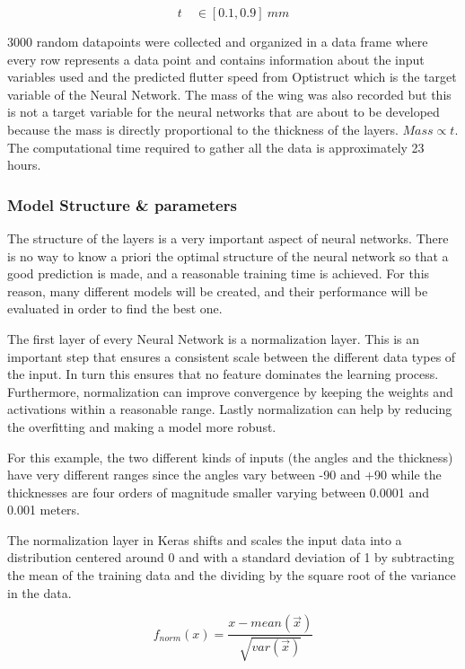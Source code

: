 \begin{equation}
t \quad \in [ 0.1, 0.9]\ mm
\end{equation}

3000 random datapoints were collected and organized in a data frame
where every row represents a data point and contains information about
the input variables used and the predicted flutter speed from Optistruct
which is the target variable of the Neural Network. The mass of the wing
was also recorded but this is not a target variable for the neural
networks that are about to be developed because the mass is directly
proportional to the thickness of the layers. \(Mass \propto t\). The
computational time required to gather all the data is approximately 23
hours.


\subsubsection{Model Structure \& parameters}

The structure of the layers is a very important aspect of neural
networks. There is no way to know a priori the optimal structure of the
neural network so that a good prediction is made, and a reasonable
training time is achieved. For this reason, many different models will
be created, and their performance will be evaluated in order to find the
best one.

The first layer of every Neural Network is a normalization layer. This
is an important step that ensures a consistent scale between the
different data types of the input. In turn this ensures that no feature
dominates the learning process. Furthermore, normalization can improve
convergence by keeping the weights and activations within a reasonable
range. Lastly normalization can help by reducing the overfitting and
making a model more robust.

For this example, the two different kinds of inputs (the angles and the
thickness) have very different ranges since the angles vary between -90
and +90 while the thicknesses are four orders of magnitude smaller
varying between 0.0001 and 0.001 meters.

The normalization layer in Keras shifts and scales the input data into a
distribution centered around 0 and with a standard deviation of 1 by
subtracting the mean of the training data and the dividing by the square
root of the variance in the data.

\begin{equation}
f_{norm}(x) = \frac{x - mean\left( \overrightarrow{x} \right)}{\sqrt{var\left( \overrightarrow{x} \right)}}
\end{equation}

